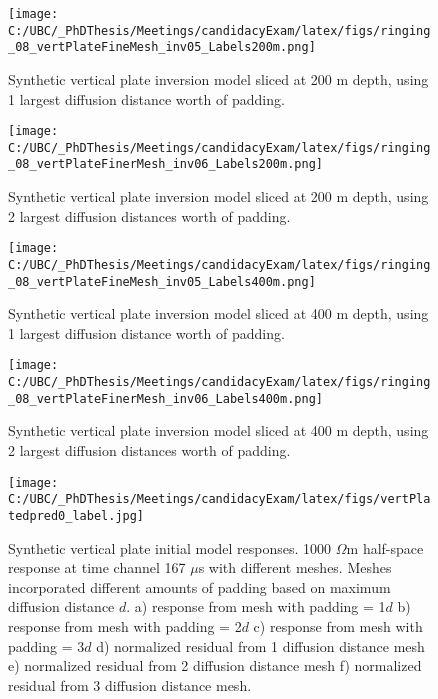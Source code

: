 \documentclass[letterpaper,11pt]{article}
\begin{document}
\begin{figure}[h]
\centering
\begin{minipage}{.5\textwidth}
\centering
\texttt{[image: C:/UBC/\_PhDThesis/Meetings/candidacyExam/latex/figs/ringing\_08\_vertPlateFineMesh\_inv05\_Labels200m.png]}
\caption{Synthetic vertical plate inversion \newline model sliced at 200 m depth, using 1 largest  \newline diffusion distance worth of padding.}
\label{fig:SynthVertPlateFineMesh}
\end{minipage}
\begin{minipage}{.45\textwidth}
\centering
\texttt{[image: C:/UBC/\_PhDThesis/Meetings/candidacyExam/latex/figs/ringing\_08\_vertPlateFinerMesh\_inv06\_Labels200m.png]}
\caption{Synthetic vertical plate inversion model sliced at 200 m depth, using 2 largest diffusion distances worth of padding.}
\label{fig:SynthVertPlateFinerMesh}
\end{minipage}
\end{figure}


\begin{figure}[h]
\centering
\begin{minipage}{.5\textwidth}
\centering
\texttt{[image: C:/UBC/\_PhDThesis/Meetings/candidacyExam/latex/figs/ringing\_08\_vertPlateFineMesh\_inv05\_Labels400m.png]}
\caption{Synthetic vertical plate inversion \newline model sliced at 400 m depth, using 1 largest \newline diffusion distance worth of padding.}
\label{fig:SynthVertPlateFineMesh400m}
\end{minipage}
\begin{minipage}{.45\textwidth}
\centering
\texttt{[image: C:/UBC/\_PhDThesis/Meetings/candidacyExam/latex/figs/ringing\_08\_vertPlateFinerMesh\_inv06\_Labels400m.png]}
\caption{Synthetic vertical plate inversion model sliced at 400 m depth, using 2 largest diffusion distances worth of padding.}
\label{fig:SynthVertPlateFinerMesh400m}
\end{minipage}
\end{figure}

\begin{figure}[h]
\centering
\texttt{[image: C:/UBC/\_PhDThesis/Meetings/candidacyExam/latex/figs/vertPlatedpred0\_label.jpg]}
\caption{Synthetic vertical plate initial model responses. 1000 $ \Omega $m half-space response at time channel 167 $ \mu $s with different meshes.  Meshes incorporated different amounts of padding based on maximum diffusion distance $ \mathit{d} $.  a) response from mesh with padding = 1$ \mathit{d} $ b) response from mesh with padding = 2$ \mathit{d} $ c) response from mesh with padding = 3$ \mathit{d} $ d) normalized residual from 1 diffusion distance mesh e) normalized residual from 2 diffusion distance mesh f) normalized residual from 3 diffusion distance mesh.}
\label{fig:SynthVertPlatedpred0}
\end{figure}
\end{document}
